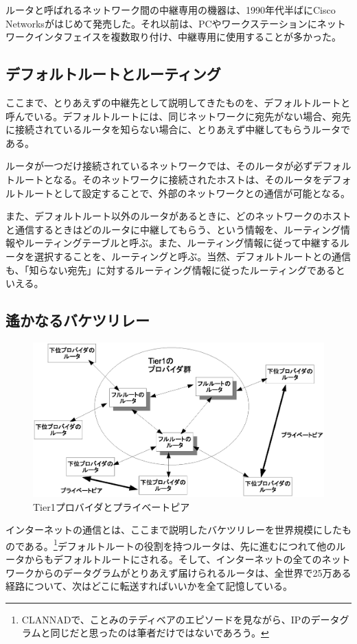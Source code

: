 ルータと呼ばれるネットワーク間の中継専用の機器は、1990年代半ばにCisco Networksがはじめて発売した。それ以前は、PCやワークステーションにネットワークインタフェイスを複数取り付け、中継専用に使用することが多かった。

\subsection{デフォルトルートとルーティング}

ここまで、とりあえずの中継先として説明してきたものを、デフォルトルートと呼んでいる。デフォルトルートには、同じネットワークに宛先がない場合、宛先に接続されているルータを知らない場合に、とりあえず中継してもらうルータである。

ルータが一つだけ接続されているネットワークでは、そのルータが必ずデフォルトルートとなる。そのネットワークに接続されたホストは、そのルータをデフォルトルートとして設定することで、外部のネットワークとの通信が可能となる。

また、デフォルトルート以外のルータがあるときに、どのネットワークのホストと通信するときはどのルータに中継してもらう、という情報を、ルーティング情報やルーティングテーブルと呼ぶ。また、ルーティング情報に従って中継するルータを選択することを、ルーティングと呼ぶ。当然、デフォルトルートとの通信も、「知らない宛先」に対するルーティング情報に従ったルーティングであるといえる。


\subsection{遙かなるバケツリレー}

\begin{figure}[htbp]
	\includegraphics[width=12cm,clip]{draw/tier1.eps}
	\caption{Tier1プロバイダとプライベートピア}
	\label{fig:tier1}
\end{figure}


インターネットの通信とは、ここまで説明したバケツリレーを世界規模にしたものである。\footnote{CLANNADで、ことみのテディベアのエピソードを見ながら、IPのデータグラムと同じだと思ったのは筆者だけではないであろう。}デフォルトルートの役割を持つルータは、先に進むにつれて他のルータからもデフォルトルートにされる。そして、インターネットの全てのネットワークからのデータグラムがとりあえず届けられるルータは、全世界で25万ある経路について、次はどこに転送すればいいかを全て記憶している。

